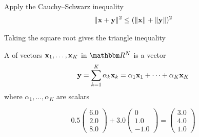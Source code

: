 \begin{frame}
    
     \vspace{2em}
    Apply the Cauchy--Schwarz inequality
    \begin{equation*}
        \| {\mathbf x} + {\mathbf y} \|^2 \leq ( \| {\mathbf x} \| + \| {\mathbf y}\|)^2
    \end{equation*}
    
      \vspace{.7em}
    Taking the square root gives the triangle inequality
    
\end{frame}


\begin{frame}
    
    \vspace{2em}
    A  of vectors ${\mathbf x}_1,\ldots, {\mathbf x}_K$ in $\RR^N$ 
    is a vector 
    \begin{equation*}
        {\mathbf y} = \sum_{k=1}^K \alpha_k {\mathbf x}_k 
        =  \alpha_1 {\mathbf x}_1 + \cdots +  \alpha_K {\mathbf x}_K 
    \end{equation*}
    where $\alpha_1,\ldots, \alpha_K$ are scalars

    \vspace{.7em}

    \Eg
    \begin{equation*}
        0.5 \left(
        \begin{array}{c}
            6.0 \\
            2.0 \\
            8.0
        \end{array}
        \right)
        +
        3.0 \left(
        \begin{array}{c}
             0 \\
             1.0 \\
             -1.0
        \end{array}
        \right)
        =
        \left(
        \begin{array}{c}
            3.0 \\
            4.0 \\
            1.0
        \end{array}
        \right)
    \end{equation*}

\end{frame}

